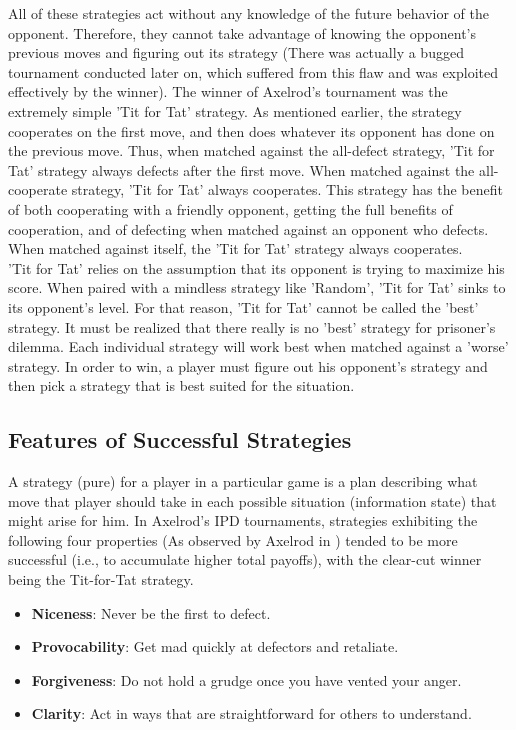 \documentclass[a4paper]{article}
\begin{document}
	All of these strategies act without any knowledge of the future behavior of the opponent. Therefore, they cannot take advantage of knowing the opponent's previous moves and figuring out its strategy (There was actually a bugged tournament conducted later on, which suffered from this flaw and was exploited effectively by the winner). The winner of Axelrod's tournament was the extremely simple 'Tit for Tat' strategy. As mentioned earlier, the strategy cooperates on the first move, and then does whatever its opponent has done on the previous move. Thus, when matched against the all-defect strategy, 'Tit for Tat' strategy always defects after the first move. When matched against the all-cooperate strategy, 'Tit for Tat' always cooperates. This strategy has the benefit of both cooperating with a friendly opponent, getting the full benefits of cooperation, and of defecting when matched against an opponent who defects. When matched against itself, the 'Tit for Tat' strategy always cooperates.\\
	'Tit for Tat' relies on the assumption that its opponent is trying to maximize his score. When paired with a mindless strategy like 'Random', 'Tit for Tat' sinks to its opponent's level. For that reason, 'Tit for Tat' cannot be called the 'best' strategy. It must be realized that there really is no 'best' strategy for prisoner's dilemma. Each individual strategy will work best when matched against a 'worse' strategy. In order to win, a player must figure out his opponent's strategy and then pick a strategy that is best suited for the situation.
	
	\subsection{Features of Successful Strategies}

A strategy (pure) for a player in a particular game is a plan describing what move that player should take in each possible situation (information state) that might arise for him.
In Axelrod’s IPD tournaments, strategies exhibiting the following four properties (As observed by Axelrod in \cite{axelrod}) tended to be more successful (i.e., to accumulate higher total payoffs), with the clear-cut winner being the Tit-for-Tat strategy.
	\begin{itemize}
		\item \textbf{Niceness}: Never be the first to defect.
		\item \textbf{Provocability}: Get mad quickly at defectors and retaliate.
		\item \textbf{Forgiveness}: Do not hold a grudge once you have vented your anger.
		\item \textbf{Clarity}: Act in ways that are straightforward for others to understand.
	\end{itemize}
\end{document}
